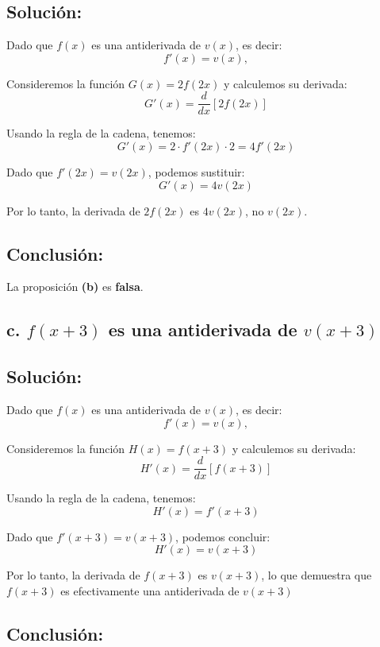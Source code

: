 \documentclass{article}
\begin{document}
\subsection*{Solución: } 

Dado que \(f(x)\) es una antiderivada de \(v(x)\), es decir:
\[
f'(x) = v(x),
\]

\noindent Consideremos la función \(G(x) = 2f(2x)\) y calculemos su derivada:
\[
G'(x) = \frac{d}{dx}[2f(2x)]
\]

\noindent Usando la regla de la cadena, tenemos:
\[
G'(x) = 2 \cdot f'(2x) \cdot 2 = 4f'(2x)
\]

\noindent Dado que \(f'(2x) = v(2x)\), podemos sustituir:
\[
G'(x) = 4v(2x)
\]

\noindent Por lo tanto, la derivada de \(2f(2x)\) es \(4v(2x)\), no \(v(2x)\).

\subsection*{Conclusión:}

La proposición \textbf{(b)} es \textbf{falsa}.

\subsection*{\newline c. \(f(x + 3)\) es una antiderivada de \(v(x + 3)\)}
\subsection*{Solución: } 

Dado que \(f(x)\) es una antiderivada de \(v(x)\), es decir:
\[
f'(x) = v(x),
\]

\noindent Consideremos la función \(H(x) = f(x + 3)\) y calculemos su derivada:
\[
H'(x) = \frac{d}{dx}[f(x + 3)]
\]

\noindent Usando la regla de la cadena, tenemos:
\[
H'(x) = f'(x + 3)
\]

\noindent Dado que \(f'(x + 3) = v(x + 3)\), podemos concluir:
\[
H'(x) = v(x + 3)
\]

\noindent Por lo tanto, la derivada de \(f(x + 3)\) es \(v(x + 3)\), lo que demuestra que \(f(x + 3)\) es efectivamente una antiderivada de \(v(x + 3)\)

\subsection*{Conclusión:}
\end{document}
